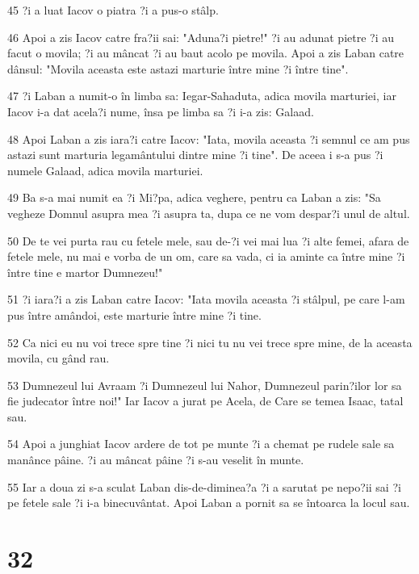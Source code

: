 \par 45 ?i a luat Iacov o piatra ?i a pus-o stâlp.
\par 46 Apoi a zis Iacov catre fra?ii sai: "Aduna?i pietre!" ?i au adunat pietre ?i au facut o movila; ?i au mâncat ?i au baut acolo pe movila. Apoi a zis Laban catre dânsul: "Movila aceasta este astazi marturie între mine ?i între tine".
\par 47 ?i Laban a numit-o în limba sa: Iegar-Sahaduta, adica movila marturiei, iar Iacov i-a dat acela?i nume, însa pe limba sa ?i i-a zis: Galaad.
\par 48 Apoi Laban a zis iara?i catre Iacov: "Iata, movila aceasta ?i semnul ce am pus astazi sunt marturia legamântului dintre mine ?i tine". De aceea i s-a pus ?i numele Galaad, adica movila marturiei.
\par 49 Ba s-a mai numit ea ?i Mi?pa, adica veghere, pentru ca Laban a zis: "Sa vegheze Domnul asupra mea ?i asupra ta, dupa ce ne vom despar?i unul de altul.
\par 50 De te vei purta rau cu fetele mele, sau de-?i vei mai lua ?i alte femei, afara de fetele mele, nu mai e vorba de un om, care sa vada, ci ia aminte ca între mine ?i între tine e martor Dumnezeu!"
\par 51 ?i iara?i a zis Laban catre Iacov: "Iata movila aceasta ?i stâlpul, pe care l-am pus între amândoi, este marturie între mine ?i tine.
\par 52 Ca nici eu nu voi trece spre tine ?i nici tu nu vei trece spre mine, de la aceasta movila, cu gând rau.
\par 53 Dumnezeul lui Avraam ?i Dumnezeul lui Nahor, Dumnezeul parin?ilor lor sa fie judecator între noi!" Iar Iacov a jurat pe Acela, de Care se temea Isaac, tatal sau.
\par 54 Apoi a junghiat Iacov ardere de tot pe munte ?i a chemat pe rudele sale sa manânce pâine. ?i au mâncat pâine ?i s-au veselit în munte.
\par 55 Iar a doua zi s-a sculat Laban dis-de-diminea?a ?i a sarutat pe nepo?ii sai ?i pe fetele sale ?i i-a binecuvântat. Apoi Laban a pornit sa se întoarca la locul sau.

\chapter{32}

